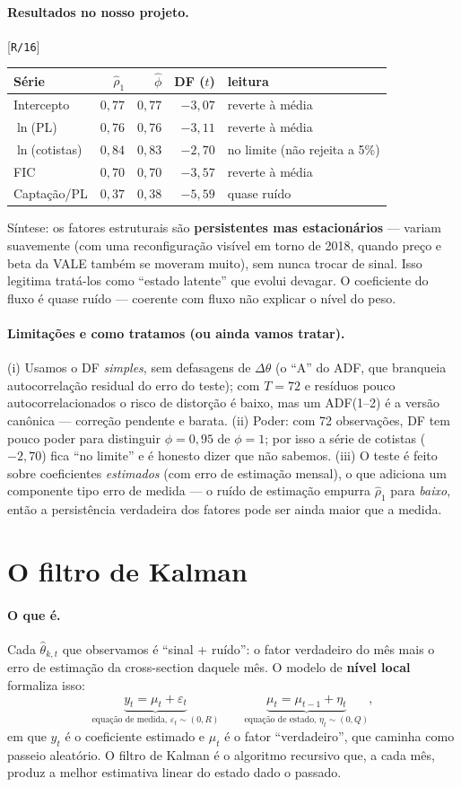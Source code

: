 \documentclass[11pt,a4paper]{article}
\newcommand{\oquee}[0]{\paragraph{O que é.}}
\newcommand{\resultados}[0]{\paragraph{Resultados no nosso projeto.}}
\newcommand{\limitacoes}[0]{\paragraph{Limitações e como tratamos (ou ainda vamos tratar).}}
\newcommand{\scriptref}[1]{{\footnotesize\color{cinza}[\texttt{#1}]}}
\begin{document}
\resultados \scriptref{R/16}

\begin{center}\small
\begin{tabular}{@{}lrrrl@{}}
\toprule
Série & $\widehat\rho_1$ & $\widehat\phi$ & DF ($t$) & leitura \\
\midrule
Intercepto & $0{,}77$ & $0{,}77$ & $-3{,}07$ & reverte à média \\
$\ln$(PL) & $0{,}76$ & $0{,}76$ & $-3{,}11$ & reverte à média \\
$\ln$(cotistas) & $0{,}84$ & $0{,}83$ & $-2{,}70$ & no limite (não rejeita a 5\%) \\
FIC & $0{,}70$ & $0{,}70$ & $-3{,}57$ & reverte à média \\
Captação/PL & $0{,}37$ & $0{,}38$ & $-5{,}59$ & quase ruído \\
\bottomrule
\end{tabular}
\end{center}

Síntese: os fatores estruturais são \textbf{persistentes mas estacionários} --- variam suavemente
(com uma reconfiguração visível em torno de 2018, quando preço e beta da VALE também se moveram
muito), sem nunca trocar de sinal. Isso legitima tratá-los como ``estado latente'' que evolui
devagar. O coeficiente do fluxo é quase ruído --- coerente com fluxo não explicar o nível do peso.

\limitacoes (i) Usamos o DF \emph{simples}, sem defasagens de $\Delta\theta$ (o ``A'' do ADF, que
branqueia autocorrelação residual do erro do teste); com $T=72$ e resíduos pouco
autocorrelacionados o risco de distorção é baixo, mas um ADF(1--2) é a versão canônica --- correção
pendente e barata. (ii) Poder: com 72 observações, DF tem pouco poder para distinguir $\phi=0{,}95$
de $\phi=1$; por isso a série de cotistas ($-2{,}70$) fica ``no limite'' e é honesto dizer que não
sabemos. (iii) O teste é feito sobre coeficientes \emph{estimados} (com erro de estimação mensal),
o que adiciona um componente tipo erro de medida --- o ruído de estimação empurra $\widehat\rho_1$
para \emph{baixo}, então a persistência verdadeira dos fatores pode ser ainda maior que a medida.

\section{O filtro de Kalman}
\label{sec:kalman}

\oquee Cada $\widehat\theta_{k,t}$ que observamos é ``sinal + ruído'': o fator verdadeiro do mês
mais o erro de estimação da cross-section daquele mês. O modelo de \textbf{nível local}
formaliza isso:
\begin{equation}
\underbrace{y_t = \mu_t + \varepsilon_t}_{\text{equação de medida, } \varepsilon_t\sim(0,R)}
\qquad
\underbrace{\mu_t = \mu_{t-1} + \eta_t}_{\text{equação de estado, } \eta_t\sim(0,Q)},
\end{equation}
em que $y_t$ é o coeficiente estimado e $\mu_t$ é o fator ``verdadeiro'', que caminha como passeio
aleatório. O filtro de Kalman é o algoritmo recursivo que, a cada mês, produz a melhor estimativa
linear do estado dado o passado.
\end{document}
